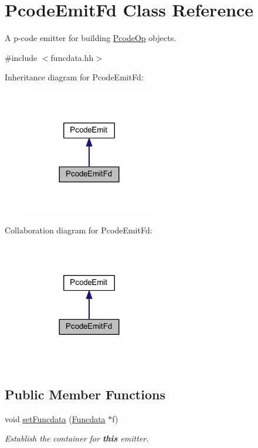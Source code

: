 \hypertarget{class_pcode_emit_fd}{}\section{Pcode\+Emit\+Fd Class Reference}
\label{class_pcode_emit_fd}


A p-\/code emitter for building \mbox{\hyperlink{class_pcode_op}{Pcode\+Op}} objects.  




{\ttfamily \#include $<$funcdata.\+hh$>$}



Inheritance diagram for Pcode\+Emit\+Fd\+:
\nopagebreak
\begin{figure}[H]
\begin{center}
\leavevmode
\includegraphics[width=156pt]{class_pcode_emit_fd__inherit__graph}
\end{center}
\end{figure}


Collaboration diagram for Pcode\+Emit\+Fd\+:
\nopagebreak
\begin{figure}[H]
\begin{center}
\leavevmode
\includegraphics[width=156pt]{class_pcode_emit_fd__coll__graph}
\end{center}
\end{figure}
\subsection*{Public Member Functions}
\begin{DoxyCompactItemize}
\item 
void \mbox{\hyperlink{class_pcode_emit_fd_ae05c7896ce87a2b2cddb2e9ec78c06aa}{set\+Funcdata}} (\mbox{\hyperlink{class_funcdata}{Funcdata}} $\ast$f)
\begin{DoxyCompactList}\small\item\em Establish the container for {\bfseries{this}} emitter. \end{DoxyCompactList}\end{DoxyCompactItemize}
